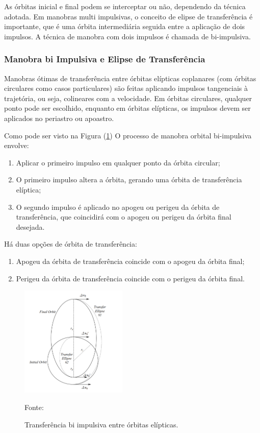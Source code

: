 \par As órbitas inicial e final podem se interceptar ou não, dependendo da técnica adotada. Em manobras multi impulsivas, o conceito de elipse de transferência é importante, que é uma órbita intermediária seguida entre a aplicação de dois impulsos. A técnica de manobra com dois impulsos é chamada de bi-impulsiva.

\subsubsection{ Manobra bi Impulsiva e Elipse de Transferência}

\par Manobras ótimas de transferência entre órbitas elípticas coplanares (com órbitas circulares como casos particulares) são feitas aplicando impulsos tangenciais à trajetória, ou seja, colineares com a velocidade. Em órbitas circulares, qualquer ponto pode ser escolhido, enquanto em órbitas elípticas, os impulsos devem ser aplicados no periastro ou apoastro.

\par Como pode ser visto na Figura (\ref{fig:transbi}) O processo de manobra orbital bi-impulsiva envolve:

\begin{enumerate}
    \item Aplicar o primeiro impulso em qualquer ponto da órbita circular;
    \item O primeiro impulso altera a órbita, gerando uma órbita de transferência elíptica;
    \item O segundo impulso é aplicado no apogeu ou perigeu da órbita de transferência, que coincidirá com o apogeu ou perigeu da órbita final desejada.
\end{enumerate}

\par Há duas opções de órbita de transferência:

\begin{enumerate}
    \item Apogeu da órbita de transferência coincide com o apogeu da órbita final;
    \item Perigeu da órbita de transferência coincide com o perigeu da órbita final.
\end{enumerate}

\begin{figure}[H]
        \centering
        \includegraphics[width=2in]{figuras/transbi.png}
        \caption{Transferência bi impulsiva entre órbitas elípticas.}
        \footnotesize Fonte: \cite{livro:andre}
        \label{fig:transbi}
\end{figure} 


